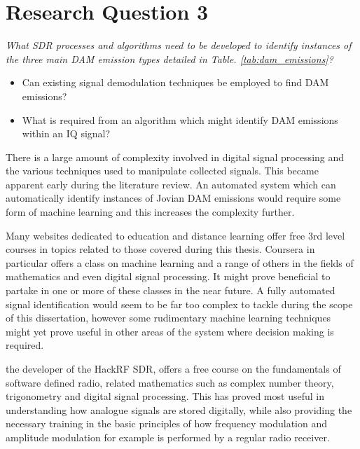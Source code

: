\documentclass[runningheads,a4paper]{llncs}
\begin{document}
\chapter*{Research Question 3}


\textit{What \gls{SDR} processes and algorithms need to be developed to identify instances of the three main \gls{DAM} emission types detailed in Table. \ref{tab:dam_emissions}?}

\begin{itemize}
	\item Can existing signal demodulation techniques be employed to find \gls{DAM} emissions?
	\item What is required from an algorithm which might identify \gls{DAM} emissions within an \gls{IQ} signal?
\end{itemize}

There is a large amount of complexity involved in digital signal processing and the various techniques used to manipulate collected signals. This became apparent early during the literature review. An automated system which can automatically identify instances of Jovian \gls{DAM} emissions would require some form of machine learning and this increases the complexity further.

Many websites dedicated to education and distance learning offer free 3rd level courses in topics related to those covered during this thesis. Coursera in particular offers a class on machine learning and a range of others in the fields of mathematics and even digital signal processing. It might prove beneficial to partake in one or more of these classes in the near future. A fully automated signal identification would seem to be far too complex to tackle during the scope of this dissertation, however some rudimentary machine learning techniques might yet prove useful in other areas of the system where decision making is required.

\cite{ossmann-15-a} the developer of the HackRF \gls{SDR}, offers a free course on the fundamentals of software defined radio, related mathematics such as complex number theory, trigonometry and digital signal processing. This has proved most useful in understanding how analogue signals are stored digitally, while also providing the necessary training in the basic principles of how frequency modulation and amplitude modulation for example is performed by a regular radio receiver. 
\end{document}
